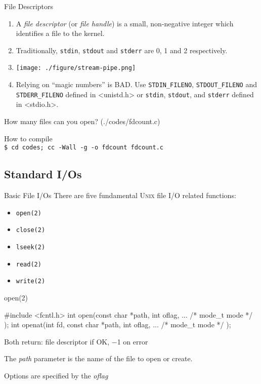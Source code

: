 \documentclass[newPxFont,sthlmFooter,nooffset]{beamer}
\begin{document}
\begin{frame}[t]{File Descriptors}
\begin{enumerate}[ ]
\item <1-> A {\em file descriptor} (or {\em file handle}) is a small, non-negative integer which identifies a file to the kernel.
\item <2-> Traditionally, \texttt{stdin}, \texttt{stdout} and \texttt{stderr} are 0, 1 and 2 respectively.
\item <3-> \hfill\texttt{[image: ./figure/stream-pipe.png]}\hfill~
\item <4-> Relying on ``magic numbers'' is BAD.  Use \texttt{STDIN\_FILENO}, \texttt{STDOUT\_FILENO} and \texttt{STDERR\_FILENO} defined in <unistd.h> or \texttt{stdin}, \texttt{stdout}, and \texttt{stderr} defined in <stdio.h>.

\end{enumerate}
\end{frame}


\begin{frame}[t]{How many files can you open? (./codes/fdcount.c)}


How to compile \\
\texttt{\$ cd codes; cc -Wall -g -o fdcount fdcount.c}

\end{frame}


\subsection{Standard I/Os}
\begin{frame}[t]{Basic File I/Os}
There are five fundamental \textsc{Unix} file I/O related functions:
\begin{itemize}
	\item \texttt{open(2)}
	\item \texttt{close(2)}
	\item \texttt{lseek(2)}
	\item \texttt{read(2)}
	\item \texttt{write(2)}
\end{itemize}
\end{frame}

\begin{frame}[containsverbatim,t]{open(2)}

\begin{codedef}
#include <fcntl.h>
int open(const char *path, int oflag, ... /* mode_t mode */ );
int openat(int fd, const char *path, int oflag, ... /* mode_t mode */ );
\end{codedef}
Both return: file descriptor if OK, −1 on error
\bigskip

The \textit{path} parameter is the name of the file to open or create.
\bigskip

Options are specified by the \textit{oflag}
\end{frame}
\end{document}
